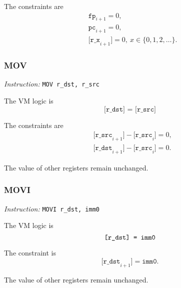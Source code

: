 The constraints are
\begin{align*}
    & \texttt{fp}_{i+1} = 0, \\
    & \texttt{pc}_{i+1} = 0, \\
    & \texttt{[r\_x}_{i+1}\texttt{]} = 0, \ x \in\{0, 1, 2, \ldots \}.
\end{align*}

\subsubsection{MOV}

\emph{Instruction:} \verb|MOV r_dst, r_src|

The VM logic is
\[ \texttt{[r\_dst] = [r\_src]} \]

The constraints are
\begin{align*}
    & \texttt{[r\_src}_{i+1}\texttt{]} - \texttt{[r\_src}_i\texttt{]} = 0, \\
    & \texttt{[r\_dst}_{i+1}\texttt{]} - \texttt{[r\_src}_i\texttt{]} = 0.
\end{align*}

The value of other registers remain unchanged.

\subsubsection{MOVI}

\emph{Instruction:} \verb|MOVI r_dst, imm0|

The VM logic is
\[ \texttt{[r\_dst] = \texttt{imm0}} \]

The constraint is
\[ \texttt{[r\_dst}_{i+1}\texttt{]} = \texttt{imm0}. \]

The value of other registers remain unchanged.
